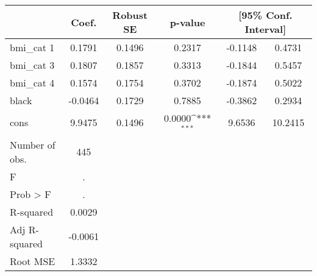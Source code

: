 {
\def\sym#1{\ifmmode^{#1}\else\(^{#1}\)\fi}
\begin{tabular}{l*{1}{ccccc}}
\toprule
            &       Coef.&   Robust SE&     p-value         &\multicolumn{2}{c}{[95\% Conf. Interval]}            \\
\midrule
bmi\_cat 1   &      0.1791&      0.1496&      0.2317         &     -0.1148&      0.4731\\
bmi\_cat 3   &      0.1807&      0.1857&      0.3313         &     -0.1844&      0.5457\\
bmi\_cat 4   &      0.1574&      0.1754&      0.3702         &     -0.1874&      0.5022\\
black       &     -0.0464&      0.1729&      0.7885         &     -0.3862&      0.2934\\
cons        &      9.9475&      0.1496&      0.0000\sym{***}&      9.6536&     10.2415\\
\midrule
Number of obs.&         445&            &                     &            &            \\
F           &           .&            &                     &            &            \\
Prob > F    &           .&            &                     &            &            \\
R-squared   &      0.0029&            &                     &            &            \\
Adj R-squared&     -0.0061&            &                     &            &            \\
Root MSE    &      1.3332&            &                     &            &            \\
\bottomrule
\end{tabular}
}
